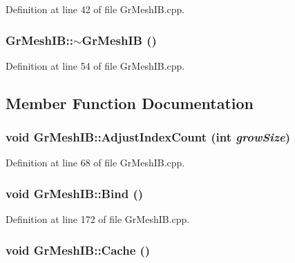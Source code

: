 Definition at line 42 of file GrMeshIB.cpp.\hypertarget{class_gr_mesh_i_b_6d29901b0246caa72ff0afa79abfc908}{
\subsubsection[{$\sim$GrMeshIB}]{\setlength{\rightskip}{0pt plus 5cm}GrMeshIB::$\sim$GrMeshIB ()}}
\label{class_gr_mesh_i_b_6d29901b0246caa72ff0afa79abfc908}




Definition at line 54 of file GrMeshIB.cpp.

\subsection{Member Function Documentation}
\hypertarget{class_gr_mesh_i_b_70b4040ac60faf6d940fb8d8c99742a5}{
\subsubsection[{AdjustIndexCount}]{\setlength{\rightskip}{0pt plus 5cm}void GrMeshIB::AdjustIndexCount (int {\em growSize})}}
\label{class_gr_mesh_i_b_70b4040ac60faf6d940fb8d8c99742a5}




Definition at line 68 of file GrMeshIB.cpp.\hypertarget{class_gr_mesh_i_b_511e7b534dbd0745e34ed4957eccd527}{
\subsubsection[{Bind}]{\setlength{\rightskip}{0pt plus 5cm}void GrMeshIB::Bind ()}}
\label{class_gr_mesh_i_b_511e7b534dbd0745e34ed4957eccd527}




Definition at line 172 of file GrMeshIB.cpp.\hypertarget{class_gr_mesh_i_b_2052ec71d1396ccc8ae46fc24d1ad3d3}{
\subsubsection[{Cache}]{\setlength{\rightskip}{0pt plus 5cm}void GrMeshIB::Cache ()}}
\label{class_gr_mesh_i_b_2052ec71d1396ccc8ae46fc24d1ad3d3}




